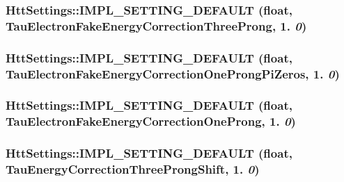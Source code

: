 \label{classHttSettings_ac5326a137aaeaacb3ac8bb41f7f57d4f}
\hypertarget{classHttSettings_a5de7225a3bae5b74e3f57a0784c4a6a9}{
\subsubsection[{IMPL\_\-SETTING\_\-DEFAULT}]{\setlength{\rightskip}{0pt plus 5cm}HttSettings::IMPL\_\-SETTING\_\-DEFAULT (float, \/  TauElectronFakeEnergyCorrectionThreeProng, \/  1. {\em 0})}}
\label{classHttSettings_a5de7225a3bae5b74e3f57a0784c4a6a9}
\hypertarget{classHttSettings_a8a2bc381791e361f3d1f2099a8fc210d}{
\subsubsection[{IMPL\_\-SETTING\_\-DEFAULT}]{\setlength{\rightskip}{0pt plus 5cm}HttSettings::IMPL\_\-SETTING\_\-DEFAULT (float, \/  TauElectronFakeEnergyCorrectionOneProngPiZeros, \/  1. {\em 0})}}
\label{classHttSettings_a8a2bc381791e361f3d1f2099a8fc210d}
\hypertarget{classHttSettings_ab36239985c161a7043a6ecc38f0808ec}{
\subsubsection[{IMPL\_\-SETTING\_\-DEFAULT}]{\setlength{\rightskip}{0pt plus 5cm}HttSettings::IMPL\_\-SETTING\_\-DEFAULT (float, \/  TauElectronFakeEnergyCorrectionOneProng, \/  1. {\em 0})}}
\label{classHttSettings_ab36239985c161a7043a6ecc38f0808ec}
\hypertarget{classHttSettings_a274ad9b3c532a2893ed7d361d9080892}{
\subsubsection[{IMPL\_\-SETTING\_\-DEFAULT}]{\setlength{\rightskip}{0pt plus 5cm}HttSettings::IMPL\_\-SETTING\_\-DEFAULT (float, \/  TauEnergyCorrectionThreeProngShift, \/  1. {\em 0})}}
